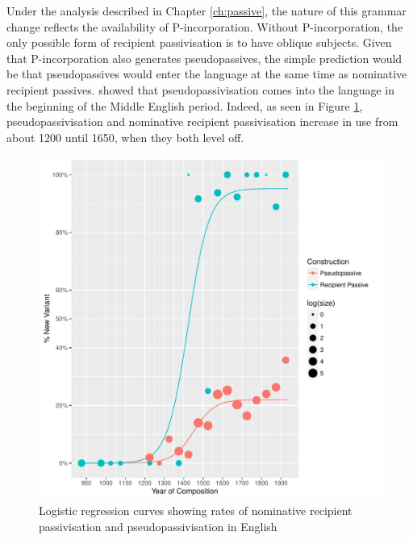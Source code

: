 	Under the analysis described in Chapter \ref{ch:passive}, the nature of this grammar change reflects the availability of P-incorporation. Without P-incorporation, the only possible form of recipient passivisation is to have oblique subjects. Given that P-incorporation also generates pseudopassives, the simple prediction would be that pseudopassives would enter the language at the same time as nominative recipient passives. \cite{Sigursson.2014} showed that pseudopassivisation comes into the language in the beginning of the Middle English period. Indeed, as seen in Figure \ref{fig:recpas-pseudo}, pseudopassivisation and nominative recipient passivisation increase in use from about 1200 until 1650, when they both level off.

	\begin{figure}[ht!]
		\includegraphics[width=\linewidth]{../images/recpas-pseudo}
		\caption{Logistic regression curves showing rates of nominative recipient passivisation and pseudopassivisation in English}
		\label{fig:recpas-pseudo}
	\end{figure}

